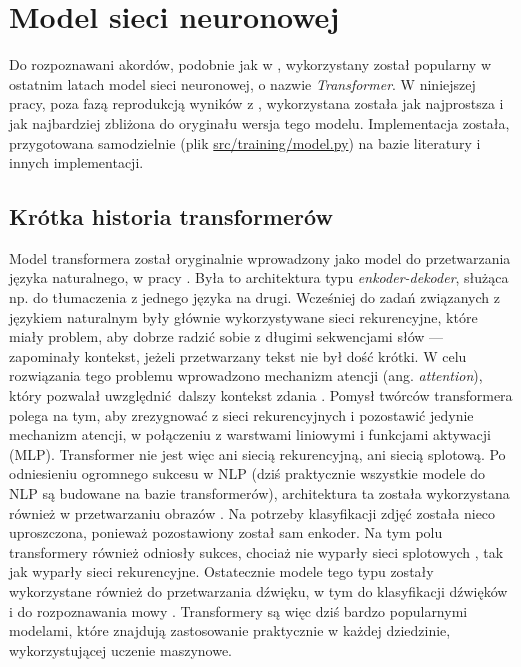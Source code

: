 \section{Model sieci neuronowej}

Do rozpoznawani akordów, podobnie jak w \cite{park_bi-directional_2019}, wykorzystany został
popularny w ostatnim latach model sieci neuronowej, o nazwie \emph{Transformer}. W niniejszej pracy,
poza fazą reprodukcją wyników z \cite{park_bi-directional_2019}, wykorzystana została jak
najprostsza i jak najbardziej zbliżona do oryginału wersja tego modelu. Implementacja została,
przygotowana samodzielnie (plik \url{src/training/model.py}) na bazie literatury i innych
implementacji.


\subsection{Krótka historia transformerów}

Model transformera został oryginalnie wprowadzony jako model do przetwarzania języka naturalnego, w
pracy \cite{vaswani_attention_2017}. Była to architektura typu \emph{enkoder-dekoder}, służąca np.
do tłumaczenia z jednego języka na drugi. Wcześniej do zadań związanych z językiem naturalnym były
głównie wykorzystywane sieci rekurencyjne, które miały problem, aby dobrze radzić sobie z długimi
sekwencjami słów --- zapominały kontekst, jeżeli przetwarzany tekst nie był dość krótki. W celu
rozwiązania tego problemu wprowadzono mechanizm atencji (ang. \emph{attention}), który pozwalał
uwzględnić dalszy kontekst zdania \cite{bahdanau_neural_2016}. Pomysł twórców transformera polega na
tym, aby zrezygnować z sieci rekurencyjnych i pozostawić jedynie mechanizm atencji, w połączeniu z
warstwami liniowymi i funkcjami aktywacji (MLP). Transformer nie jest więc ani siecią rekurencyjną,
ani siecią splotową. Po odniesieniu ogromnego sukcesu w NLP (dziś praktycznie wszystkie modele do
NLP są budowane na bazie transformerów), architektura ta została wykorzystana również w
przetwarzaniu obrazów \cite{dosovitskiy_image_2021}. Na potrzeby klasyfikacji zdjęć została nieco
uproszczona, ponieważ pozostawiony został sam enkoder. Na tym polu transformery również odniosły
sukces, chociaż nie wyparły sieci splotowych \cite{liu_convnet_2022}, tak jak wyparły sieci
rekurencyjne. Ostatecznie modele tego typu zostały wykorzystane również do przetwarzania dźwięku, w
tym do klasyfikacji dźwięków \cite{gong_ast_2021} i do rozpoznawania mowy
\cite{kim_squeezeformer_2022}. Transformery są więc dziś bardzo popularnymi modelami, które znajdują
zastosowanie praktycznie w każdej dziedzinie, wykorzystującej uczenie maszynowe.

